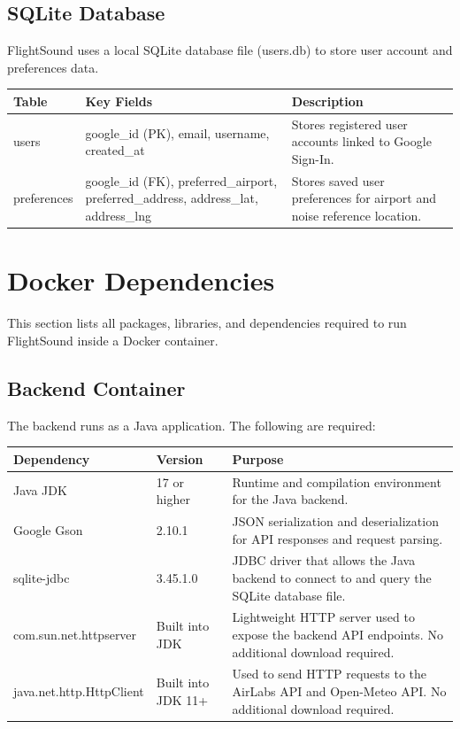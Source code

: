 \documentclass[12pt]{article}
\begin{document}
\subsection{SQLite Database}
FlightSound uses a local SQLite database file (users.db) to store user account and preferences data.

\begin{tabular}{|l|p{4cm}|p{6cm}|}
\hline
Table & Key Fields & Description \\
\hline
users & google\_id (PK), email, username, created\_at & Stores registered user accounts linked to Google Sign-In. \\
\hline
preferences & google\_id (FK), preferred\_airport, preferred\_address, address\_lat, address\_lng & Stores saved user preferences for airport and noise reference location. \\
\hline
\end{tabular}

\newpage

\section{Docker Dependencies}

This section lists all packages, libraries, and dependencies required to run FlightSound inside a Docker container.

\subsection{Backend Container}

The backend runs as a Java application. The following are required:

\begin{tabular}{|l|l|p{6cm}|}
\hline
Dependency & Version & Purpose \\
\hline
Java JDK & 17 or higher & Runtime and compilation environment for the Java backend. \\
\hline
Google Gson & 2.10.1 & JSON serialization and deserialization for API responses and request parsing. \\
\hline
sqlite-jdbc & 3.45.1.0 & JDBC driver that allows the Java backend to connect to and query the SQLite database file. \\
\hline
com.sun.net.httpserver & Built into JDK & Lightweight HTTP server used to expose the backend API endpoints. No additional download required. \\
\hline
java.net.http.HttpClient & Built into JDK 11+ & Used to send HTTP requests to the AirLabs API and Open-Meteo API. No additional download required. \\
\hline
\end{tabular}
\end{document}
